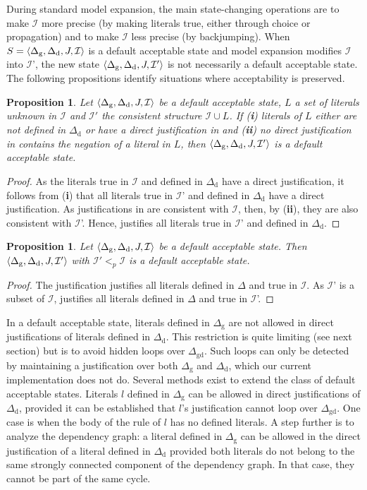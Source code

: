 \documentclass[11pt]{article}
\newcommand{\m}[1]{\ensuremath{#1}\xspace}
\newcommand{\I}{\m{\mathcal{I}}}
\newcommand{\D}{\m{\Delta}}
\newcommand{\tuple}[1]{\m{\left \langle #1 \right \rangle }}
\theoremstyle{plain}
\newtheorem{proposition}[thm]{Proposition}
\theoremstyle{definition}
\theoremstyle{example_basic}
\theoremstyle{example_contd}
\theoremstyle{plain}
\newcommand{\Dg}{\ensuremath{\D_\text{g}}\xspace}
\newcommand{\Dd}{\ensuremath{\D_\text{d}}\xspace}
\newcommand{\Dgd}{\ensuremath{\D_\text{gd}}\xspace}
\newcommand{\tbf}[1]{\textbf{#1}}
\newcommand{\change}[1]{#1}
\begin{document}
\change{During standard model expansion, the main state-changing operations are to make \I more precise (by making literals true, either through choice or propagation) and to make \I less precise (by backjumping).} When $S = \tuple{\Dg,\Dd,\jgraph,\I}$ is a default acceptable state and model expansion modifies \I into \I', the new state $\tuple{\Dg,\Dd,\jgraph,\I'}$ is not necessarily a default acceptable state. The following propositions identify situations where acceptability is preserved.

\begin{proposition}\label{prop:forward}
  Let $\tuple{\Dg, \Dd, \jgraph, \I}$ be a default acceptable state, $L$ a set of literals unknown in \I and $\I'$ the consistent structure $\I \cup L$. If (\tbf{i}) literals of $L$ either are not defined in \Dd or have a direct justification in \jgraph and (\tbf{ii}) no direct justification in \jgraph contains the negation of a literal in $L$, then $\tuple{\Dg, \Dd, \jgraph, \I'}$ is a default acceptable state.
\end{proposition}
\begin{proof}
  As the literals true in \I and defined in \Dd have a direct justification, it follows from (\tbf{i}) that all literals true in \I' and defined in \Dd have a direct justification. As justifications in \jgraph are consistent with \I, then, by (\tbf{ii}), they are also consistent with \I'. Hence, \jgraph justifies all literals true in \I' and defined in \Dd.
\end{proof}


\begin{proposition}\label{prop:backward}
  Let $\tuple{\Dg, \Dd, \jgraph, \I}$ be a default acceptable state.
  Then $\tuple{\Dg, \Dd, \jgraph, \I'}$ with $\I' <_p \I$ is a
  default acceptable state.
\end{proposition}

\begin{proof}
  The justification \jgraph justifies all literals defined in
  \D and true in \I. As \I' is a subset of \I, \jgraph
  justifies all literals defined in \D and true in \I'.
\end{proof}

\change{In a default acceptable state,  literals defined in \Dg are not allowed in direct justifications of  literals defined in \Dd. This restriction is quite limiting (see next section) but is to avoid hidden loops over \Dgd. Such loops can only be detected by  maintaining a justification over both \Dg and \Dd, which our current implementation does not do. 
Several methods exist to extend the class of default acceptable states. Literals $l$ defined in \Dg can be allowed in direct justifications of \Dd, provided it can be established that $l$'s justification cannot loop over \Dgd. One case is when the body of the rule of $l$  has no defined literals. A step further is to analyze the dependency graph: a literal  defined in \Dg can be allowed in the direct justification of a literal defined in \Dd provided both literals do not belong to the same strongly connected component of the dependency graph. In that case, they cannot be part of the same cycle.}
\end{document}

